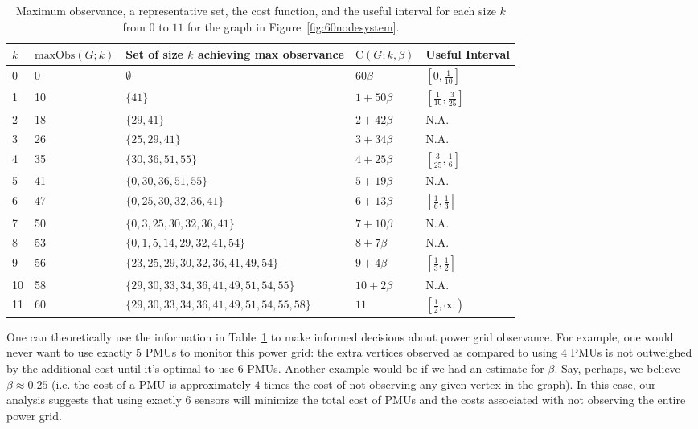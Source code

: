 \documentclass{article}
\begin{document}
        \begin{table}
        	\centering
        	\begin{tabular}{|l|l|l|l|l|}
        		\hline
        		$k$&$\mathrm{maxObs}(G;k)$&Set of size $k$ achieving max observance&$\mathrm{C}(G;k,\beta)$&Useful Interval\\ 
        		\hline
        		0&0&$\emptyset$&$60\beta$& $\left[0,\frac{1}{10}\right]$\\ 
        		\hline
        		1&10&$\{41\}$&$1 + 50\beta$     & $\left[\frac{1}{10},\frac{3}{25}\right]$\\ 
        		\hline
        		2&18&$\{29, 41\}$&$2 + 42\beta$     & N.A. \\ 
        		\hline
        		3&26&$\{25, 29, 41\}$&$3 + 34\beta$     & N.A.\\ 
        		\hline
        		4&35&$\{30, 36, 51, 55\}$&$4 + 25\beta$     & $\left[\frac{3}{25},\frac{1}{6}\right]$\\ 
        		\hline
        		5&41&$\{0, 30, 36, 51, 55\}$&$5 + 19\beta$     & N.A.\\ 
        		\hline
        		6&47&$\{0, 25, 30, 32, 36, 41\}$&$6 + 13\beta$     & $\left[\frac{1}{6},\frac{1}{3}\right]$ \\
                \hline
        		7&50&$\{0, 3, 25, 30, 32, 36, 41\}$&$7 + 10\beta$     &N.A.\\ 
        		\hline
        		8&53&$\{0, 1, 5, 14, 29, 32, 41, 54\}$&$8 + 7\beta$      &N.A.\\ 
        		\hline
        		9&56&$\{23, 25, 29, 30, 32, 36, 41, 49, 54\}$&$9 + 4\beta$& $\left[\frac{1}{3},\frac{1}{2}\right]$\\ 
        		\hline
        		10&58&$\{29, 30, 33, 34, 36, 41, 49, 51, 54, 55\}$& $10 + 2\beta$&N.A.\\ 
        		\hline
        		11&60&$\{29, 30, 33, 34, 36, 41, 49, 51, 54, 55, 58\}$ & $11$& $\left[\frac{1}{2},\infty\right)$\\ 
        		\hline
        	\end{tabular}
        	\caption{Maximum observance, a representative set, the cost function, and the useful interval for each size $k$ from $0$ to $11$ for the graph in Figure~\ref{fig:60nodesystem}.}
        	\label{tab:betabestsets}
        \end{table}
        
        One can theoretically use the information in Table~\ref{tab:betabestsets} to make informed decisions about power grid observance.
        For example, one would never want to use exactly $5$ PMUs to monitor this power grid: the extra vertices observed as compared to using $4$ PMUs is not outweighed by the additional cost until it's optimal to use $6$ PMUs.
        Another example would be if we had an estimate for $\beta$.
        Say, perhaps, we believe $\beta\approx 0.25$ (i.e. the cost of a PMU is approximately $4$ times the cost of not observing any given vertex in the graph).
        In this case, our analysis suggests that using exactly $6$ sensors will minimize the total cost of PMUs and the costs associated with not observing the entire power grid.
        
\end{document}
